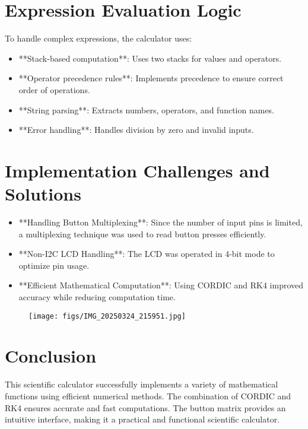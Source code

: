 \documentclass[a4paper,12pt]{article}
\begin{document}
\section{Expression Evaluation Logic}
To handle complex expressions, the calculator uses:
\begin{itemize}
    \item **Stack-based computation**: Uses two stacks for values and operators.
    \item **Operator precedence rules**: Implements precedence to ensure correct order of operations.
    \item **String parsing**: Extracts numbers, operators, and function names.
    \item **Error handling**: Handles division by zero and invalid inputs.
\end{itemize}

\section{Implementation Challenges and Solutions}
\begin{itemize}
    \item **Handling Button Multiplexing**: Since the number of input pins is limited, a multiplexing technique was used to read button presses efficiently.
    \item **Non-I2C LCD Handling**: The LCD was operated in 4-bit mode to optimize pin usage.
    \item **Efficient Mathematical Computation**: Using CORDIC and RK4 improved accuracy while reducing computation time.
\end{itemize}

\begin{figure}[H]
    \centering
        \texttt{[image: figs/IMG\_20250324\_215951.jpg]}
\end{figure}

\section{Conclusion}
This scientific calculator successfully implements a variety of mathematical functions using efficient numerical methods. The combination of CORDIC and RK4 ensures accurate and fast computations. The button matrix provides an intuitive interface, making it a practical and functional scientific calculator.
\end{document}
